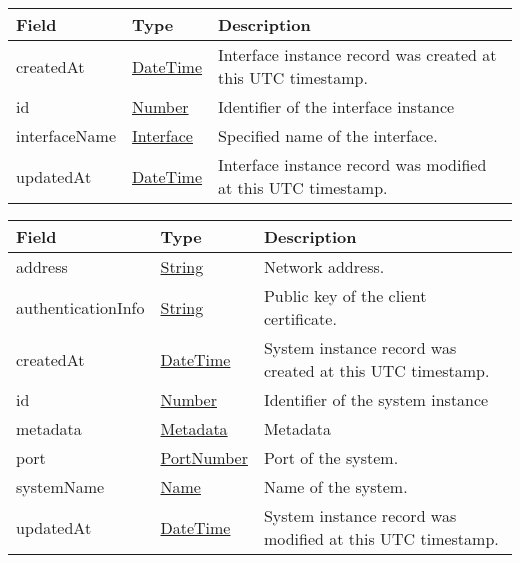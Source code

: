 \documentclass[a4paper]{arrowhead}
\newcommand{\pref}[1]{{\textcolor{ArrowheadGrey}{\hyperref[sec:model:primitives:#1]{#1}}}}
\begin{document}

\begin{table}[ht!]
\begin{tabularx}{\textwidth}{| p{4.25cm} | p{3.5cm} | X |} \hline
\rowcolor{gray!33} Field & Type      & Description \\ \hline
createdAt & \pref{DateTime} & Interface instance record was created at this UTC timestamp. \\ \hline
id & \pref{Number} & Identifier of the interface instance \\ \hline
interfaceName &\pref{Interface}  & Specified name of the interface. \\ \hline
updatedAt & \pref{DateTime} & Interface instance record was modified at this UTC timestamp. \\ \hline
\end{tabularx}
\end{table}

\clearpage


\begin{table}[ht!]
\begin{tabularx}{\textwidth}{| p{4.25cm} | p{3.5cm} | X |} \hline
\rowcolor{gray!33} Field & Type      & Description \\ \hline
address & \pref{String} & Network address. \\ \hline
authenticationInfo & \pref{String}     & Public key of the client certificate. \\ \hline
createdAt & \pref{DateTime} & System instance record was created at this UTC timestamp. \\ \hline
id & \pref{Number} & Identifier of the system instance \\ \hline
metadata & \pref{Metadata}     & Metadata \\ \hline
port & \pref{PortNumber} & Port of the system. \\ \hline
systemName &\pref{Name}  & Name of the system. \\ \hline
updatedAt & \pref{DateTime} & System instance record was modified at this UTC timestamp. \\ \hline
\end{tabularx}
\end{table}

\end{document}
